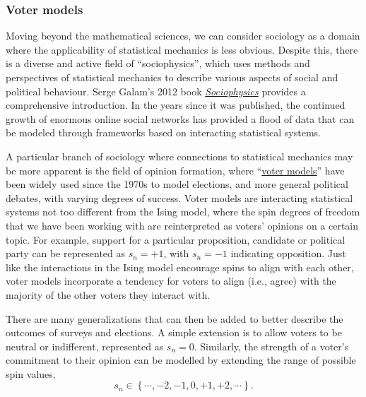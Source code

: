 \subsubsection*{Voter models}
Moving beyond the mathematical sciences, we can consider sociology as a domain where the applicability of statistical mechanics is less obvious.
Despite this, there is a diverse and active field of ``sociophysics'', which uses methods and perspectives of statistical mechanics to describe various aspects of social and political behaviour.
Serge Galam's 2012 book \href{https://liverpool.idm.oclc.org/login?url=http://dx.doi.org/10.1007/978-1-4614-2032-3}{\textit{Sociophysics}} provides a comprehensive introduction.
In the years since it was published, the continued growth of enormous online social networks has provided a flood of data that can be modeled through frameworks based on interacting statistical systems.

A particular branch of sociology where connections to statistical mechanics may be more apparent is the field of opinion formation, where ``\href{https://en.wikipedia.org/wiki/Voter_model}{voter models}'' have been widely used since the 1970s to model elections, and more general political debates, with varying degrees of success.
Voter models are interacting statistical systems not too different from the Ising model, where the spin degrees of freedom that we have been working with are reinterpreted as voters' opinions on a certain topic.
For example, support for a particular proposition, candidate or political party can be represented as $s_n = +1$, with $s_n = -1$ indicating opposition.
Just like the interactions in the Ising model encourage spins to align with each other, voter models incorporate a tendency for voters to align (i.e., agree) with the majority of the other voters they interact with.

There are many generalizations that can then be added to better describe the outcomes of surveys and elections.
A simple extension is to allow voters to be neutral or indifferent, represented as $s_n = 0$.
Similarly, the strength of a voter's commitment to their opinion can be modelled by extending the range of possible spin values,
\begin{equation*}
  s_n \in \left\{\cdots, -2, -1, 0, +1, +2, \cdots\right\}.
\end{equation*}

